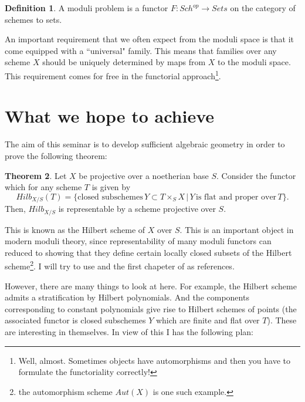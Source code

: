 \documentclass[11pt]{amsart}
\theoremstyle{definition}
\newtheorem{theorem}{Theorem}
\newtheorem{definition}[theorem]{Definition}
\begin{document}
\begin{definition}
	A moduli problem is a functor $F: Sch^{op} \rightarrow Sets$ on the category of schemes to sets.
\end{definition}

An important requirement that we often expect from the moduli space is that it come equipped with a ``universal" family. This means that families over any scheme $X$ should be uniquely determined by maps from $X$ to the moduli space. This requirement comes for free in the functorial approach\footnote{Well, almost. Sometimes objects have automorphisms and then you have to formulate the functoriality correctly!}.


\section{What we hope to achieve}

The aim of this seminar is to develop sufficient algebraic geometry in order to prove the following theorem:

\begin{theorem}\label{Hilb}
	Let $X$ be projective over a noetherian base $S$. Consider the functor which for any scheme $T$ is given by
	\[Hilb_{X/S}(T)=\bigl\{\text{closed subschemes}\,Y\subset T\times_S X\, |\, Y \,\text{is flat and proper over}\, T \bigr\}.\]
	Then, $Hilb_{X/S}$ is representable by a scheme projective over $S$.
\end{theorem}

This is known as the Hilbert scheme of $X$ over $S$. This is an important object in modern moduli theory, since representability of many moduli functors can reduced to showing that they define certain locally closed subsets of the Hilbert scheme\footnote{the automorphism scheme $Aut(X)$ is one such example.}. I will try to use \cite{FGAExplained} and the first chapeter of \cite{Kollar} as references. 

However, there are many things to look at here. For example, the Hilbert scheme admits a stratification by Hilbert polynomials. And the components corresponding to constant polynomials give rise to Hilbert schemes of points (the associated functor is closed subschemes $Y$ which are finite and flat over $T$). These are interesting in themselves. In view of this I has the following plan:
\vspace{.3cm}
\end{document}
